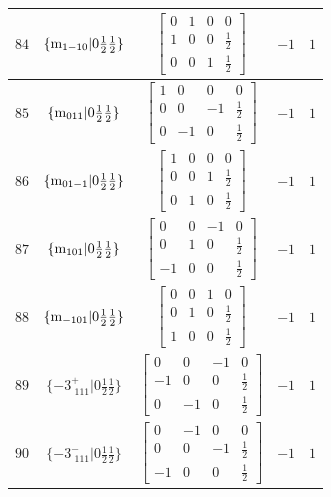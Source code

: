 \documentclass[fleqn,8pt]{jsarticle}
\begin{document}
\begin{longtable}{ccccc}
$ 84 $ & $ \{{\rm m}_{1-10}|0 \frac{1}{2} \frac{1}{2}\} $ & $ \begin{bmatrix} 0 & 1 & 0 & 0 \\ 1 & 0 & 0 & \frac{1}{2} \\ 0 & 0 & 1 & \frac{1}{2} \end{bmatrix} $ & $ -1 $ & $ 1 $ \\ \hline
$ 85 $ & $ \{{\rm m}_{011}|0 \frac{1}{2} \frac{1}{2}\} $ & $ \begin{bmatrix} 1 & 0 & 0 & 0 \\ 0 & 0 & -1 & \frac{1}{2} \\ 0 & -1 & 0 & \frac{1}{2} \end{bmatrix} $ & $ -1 $ & $ 1 $ \\ \hline
$ 86 $ & $ \{{\rm m}_{01-1}|0 \frac{1}{2} \frac{1}{2}\} $ & $ \begin{bmatrix} 1 & 0 & 0 & 0 \\ 0 & 0 & 1 & \frac{1}{2} \\ 0 & 1 & 0 & \frac{1}{2} \end{bmatrix} $ & $ -1 $ & $ 1 $ \\ \hline
$ 87 $ & $ \{{\rm m}_{101}|0 \frac{1}{2} \frac{1}{2}\} $ & $ \begin{bmatrix} 0 & 0 & -1 & 0 \\ 0 & 1 & 0 & \frac{1}{2} \\ -1 & 0 & 0 & \frac{1}{2} \end{bmatrix} $ & $ -1 $ & $ 1 $ \\ \hline
$ 88 $ & $ \{{\rm m}_{-101}|0 \frac{1}{2} \frac{1}{2}\} $ & $ \begin{bmatrix} 0 & 0 & 1 & 0 \\ 0 & 1 & 0 & \frac{1}{2} \\ 1 & 0 & 0 & \frac{1}{2} \end{bmatrix} $ & $ -1 $ & $ 1 $ \\ \hline
$ 89 $ & $ \{-3^{+}_{\,\,111}|0 \frac{1}{2} \frac{1}{2}\} $ & $ \begin{bmatrix} 0 & 0 & -1 & 0 \\ -1 & 0 & 0 & \frac{1}{2} \\ 0 & -1 & 0 & \frac{1}{2} \end{bmatrix} $ & $ -1 $ & $ 1 $ \\ \hline
$ 90 $ & $ \{-3^{-}_{\,\,111}|0 \frac{1}{2} \frac{1}{2}\} $ & $ \begin{bmatrix} 0 & -1 & 0 & 0 \\ 0 & 0 & -1 & \frac{1}{2} \\ -1 & 0 & 0 & \frac{1}{2} \end{bmatrix} $ & $ -1 $ & $ 1 $ \\ \hline

\end{longtable}
\end{document}
